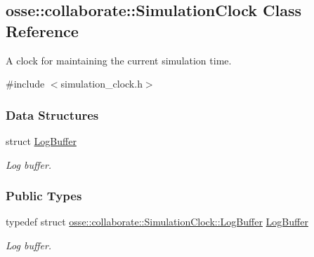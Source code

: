 \hypertarget{classosse_1_1collaborate_1_1_simulation_clock}{}\subsection{osse\+:\+:collaborate\+:\+:Simulation\+Clock Class Reference}
\label{classosse_1_1collaborate_1_1_simulation_clock}


A clock for maintaining the current simulation time.  




{\ttfamily \#include $<$simulation\+\_\+clock.\+h$>$}

\subsubsection*{Data Structures}
\begin{DoxyCompactItemize}
\item 
struct \hyperlink{structosse_1_1collaborate_1_1_simulation_clock_1_1_log_buffer}{Log\+Buffer}
\begin{DoxyCompactList}\small\item\em Log buffer. \end{DoxyCompactList}\end{DoxyCompactItemize}
\subsubsection*{Public Types}
\begin{DoxyCompactItemize}
\item 
\mbox{\label{classosse_1_1collaborate_1_1_simulation_clock_add9ec31a41ed5f7d75967e98396c021d}} 
typedef struct \hyperlink{structosse_1_1collaborate_1_1_simulation_clock_1_1_log_buffer}{osse\+::collaborate\+::\+Simulation\+Clock\+::\+Log\+Buffer} \hyperlink{classosse_1_1collaborate_1_1_simulation_clock_add9ec31a41ed5f7d75967e98396c021d}{Log\+Buffer}
\begin{DoxyCompactList}\small\item\em Log buffer. \end{DoxyCompactList}\end{DoxyCompactItemize}
